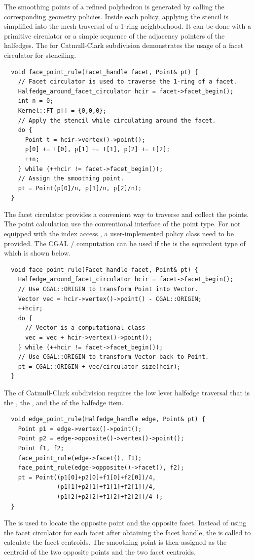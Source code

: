 The smoothing points of a refined polyhedron is generated by calling
the corresponding geometry policies.  Inside each policy, applying the
stencil is simplified into the mesh traversal of a 1-ring
neighborhood. It can be done with a primitive circulator or a simple
sequence of the adjacency pointers of the halfedges. The
 for Catmull-Clark subdivision demonstrates
the usage of a facet circulator for stenciling.
\begin{lstlisting}
  void face_point_rule(Facet_handle facet, Point& pt) {
    // Facet circulator is used to traverse the 1-ring of a facet.
    Halfedge_around_facet_circulator hcir = facet->facet_begin();
    int n = 0;
    Kernel::FT p[] = {0,0,0};
    // Apply the stencil while circulating around the facet. 
    do {
      Point t = hcir->vertex()->point();
      p[0] += t[0], p[1] += t[1], p[2] += t[2]; 
      ++n;
    } while (++hcir != facet->facet_begin());
    // Assign the smoothing point.
    pt = Point(p[0]/n, p[1]/n, p[2]/n);
  }
\end{lstlisting}
The facet circulator provides a convenient way to
traverse and collect the points. The point calculation use
the conventional interface \CodeFmt{[i]} of the point type. 
For  not equipped with the index access 
\CodeFmt{[i]}, a user-implemented policy class need to be 
provided. The CGAL /
computation can be used if the  is the equivalent
type of  which is shown below. 
\begin{lstlisting}
  void face_point_rule(Facet_handle facet, Point& pt) {
    Halfedge_around_facet_circulator hcir = facet->facet_begin();
    // Use CGAL::ORIGIN to transform Point into Vector.
    Vector vec = hcir->vertex()->point() - CGAL::ORIGIN;
    ++hcir;
    do {
      // Vector is a computational class
      vec = vec + hcir->vertex()->point();
    } while (++hcir != facet->facet_begin());
    // Use CGAL::ORIGIN to transform Vector back to Point.
    pt = CGAL::ORIGIN + vec/circulator_size(hcir);
  }
\end{lstlisting}

The  of
Catmull-Clark subdivision requires the low lever 
halfedge traversal that is the ,
the , and the 
of the halfedge item.
\begin{lstlisting}
  void edge_point_rule(Halfedge_handle edge, Point& pt) {
    Point p1 = edge->vertex()->point();
    Point p2 = edge->opposite()->vertex()->point();
    Point f1, f2;
    face_point_rule(edge->facet(), f1);
    face_point_rule(edge->opposite()->facet(), f2);
    pt = Point((p1[0]+p2[0]+f1[0]+f2[0])/4,
               (p1[1]+p2[1]+f1[1]+f2[1])/4,
               (p1[2]+p2[2]+f1[2]+f2[2])/4 );
  }
\end{lstlisting}
The  is used to locate the opposite point
and the opposite facet. Instead of using the facet circulator for each
facet after obtaining the facet handle, the
 is called to calculate the facet
centroids. The smoothing point is then assigned as the centroid of the
two opposite points and the two facet centroids.

